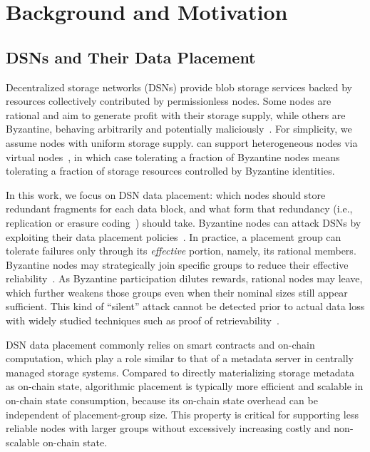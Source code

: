 \section{Background and Motivation}
\label{sec:motivation}

\subsection{DSNs and Their Data Placement}

Decentralized storage networks (DSNs) provide blob storage services backed by resources collectively contributed by permissionless nodes.
Some nodes are rational and aim to generate profit with their storage supply, while others are Byzantine, behaving arbitrarily and potentially maliciously~\cite{bar}.
For simplicity, we assume nodes with uniform storage supply.
\sys can support heterogeneous nodes via virtual nodes~\cite{chord}, in which case tolerating a fraction of Byzantine nodes means tolerating a fraction of storage resources controlled by Byzantine identities.
 

In this work, we focus on DSN data placement: which nodes should store redundant fragments for each data block, and what form that redundancy (i.e., replication or erasure coding~\cite{rs-code}) should take.
Byzantine nodes can attack DSNs by exploiting their data placement policies~\cite{ipfs-attack,bittorrent-attack}.
In practice, a placement group can tolerate failures only through its \emph{effective} portion, namely, its rational members.
Byzantine nodes may strategically join specific groups to reduce their effective reliability~\cite{ouroboros,elastico}.
As Byzantine participation dilutes rewards, rational nodes may leave, which further weakens those groups even when their nominal sizes still appear sufficient.
This kind of ``silent'' attack cannot be detected prior to actual data loss with widely studied techniques such as proof of retrievability~\cite{por}.

DSN data placement commonly relies on smart contracts and on-chain computation, which play a role similar to that of a metadata server in centrally managed storage systems.
Compared to directly materializing storage metadata as on-chain state,
algorithmic placement is typically more efficient and scalable in on-chain state consumption, because its on-chain state overhead can be independent of placement-group size.
This property is critical for supporting less reliable nodes with larger groups without excessively increasing costly and non-scalable on-chain state.

